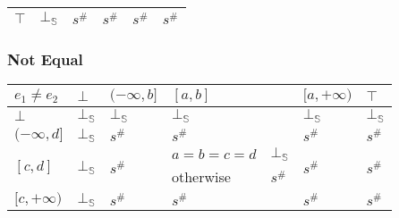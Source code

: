 \documentclass{beamer}
\begin{document}
\begin{frame}
\begin{table}
{\begin{tabular}{|l|l|ll|ll|ll|l|}
        $\top$                          & $\bot_\mathbb{S}$                  & \multicolumn{2}{l|}{$s^\#$}                                                        & \multicolumn{2}{l|}{$s^\#$}                                    & \multicolumn{2}{l|}{$s^\#$}                                                  & $s^\#$                                          \\ \hline
        \end{tabular}}
        \end{table}
    \end{frame}
    
        \begin{frame}
            \frametitle{Not Equal}
    \begin{table}
        \begin{tabular}{|l|l|ll|ll|ll|l|}
        \hline
        $e_1 \ne e_2$                   & $\bot$                  & \multicolumn{2}{l|}{$(-\infty, b]$}          & \multicolumn{2}{l|}{$[a, b]$}                & \multicolumn{2}{l|}{$[a, +\infty)$}          & $\top$                  \\ \hline
        $\bot$                          & $\bot_\mathbb{S}$                  & \multicolumn{2}{l|}{$\bot_\mathbb{S}$}                  & \multicolumn{2}{l|}{$\bot_\mathbb{S}$}                  & \multicolumn{2}{l|}{$\bot_\mathbb{S}$}                  & $\bot_\mathbb{S}$                  \\ \hline
        $(-\infty, d]$                  & $\bot_\mathbb{S}$                  & \multicolumn{2}{l|}{$s^\#$}                  & $s^\#$                     &                 & \multicolumn{2}{l|}{$s^\#$}                  & $s^\#$                  \\ \hline
        \multirow{2}{*}{$[c, d]$}       & \multirow{2}{*}{$\bot_\mathbb{S}$} & \multicolumn{2}{l|}{\multirow{2}{*}{$s^\#$}} & $a = b = c = d$            & $\bot_\mathbb{S}$          & \multicolumn{2}{l|}{\multirow{2}{*}{$s^\#$}} & \multirow{2}{*}{$s^\#$} \\
                                        &                         & \multicolumn{2}{l|}{}                        & otherwise                  & $s^\#$          & \multicolumn{2}{l|}{}                        &                         \\ \hline
        \multirow{3}{*}{$[c, +\infty)$} & \multirow{3}{*}{$\bot_\mathbb{S}$} & \multicolumn{2}{l|}{\multirow{3}{*}{$s^\#$}} & \multicolumn{2}{l|}{\multirow{3}{*}{$s^\#$}} & \multicolumn{2}{l|}{\multirow{3}{*}{$s^\#$}} & \multirow{3}{*}{$s^\#$} \\

\end{tabular}
\end{table}
\end{frame}
\end{document}
